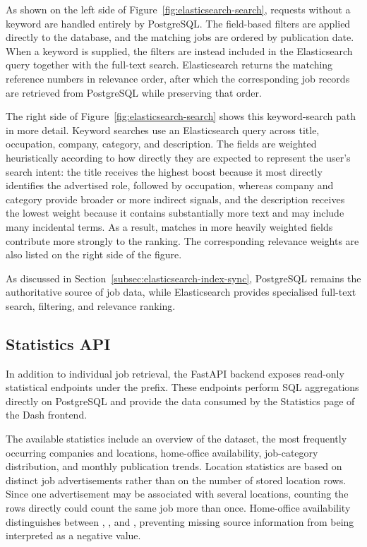 \documentclass[11pt,a4paper]{article}
\begin{document}
As shown on the left side of Figure~\ref{fig:elasticsearch-search}, requests without a keyword are handled entirely by PostgreSQL. The field-based filters are applied directly to the database, and the matching jobs are ordered by publication date. When a keyword is supplied, the filters are instead included in the Elasticsearch query together with the full-text search. Elasticsearch returns the matching reference numbers in relevance order, after which the corresponding job records are retrieved from PostgreSQL while preserving that order.

The right side of Figure~\ref{fig:elasticsearch-search} shows this keyword-search path in more detail. Keyword searches use an Elasticsearch  query across title, occupation, company, category, and description. The fields are weighted heuristically according to how directly they are expected to represent the user's search intent: the title receives the highest boost because it most directly identifies the advertised role, followed by occupation, whereas company and category provide broader or more indirect signals, and the description receives the lowest weight because it contains substantially more text and may include many incidental terms. As a result, matches in more heavily weighted fields contribute more strongly to the ranking. The corresponding relevance weights are also listed on the right side of the figure.

As discussed in Section~\ref{subsec:elasticsearch-index-sync}, PostgreSQL remains the authoritative source of job data, while Elasticsearch provides specialised full-text search, filtering, and relevance ranking.


\subsection{Statistics API}

In addition to individual job retrieval, the FastAPI backend exposes read-only statistical endpoints under the  prefix. These endpoints perform SQL aggregations directly on PostgreSQL and provide the data consumed by the Statistics page of the Dash frontend.

The available statistics include an overview of the dataset, the most frequently occurring companies and locations, home-office availability, job-category distribution, and monthly publication trends. Location statistics are based on distinct job advertisements rather than on the number of stored location rows. Since one advertisement may be associated with several locations, counting the rows directly could count the same job more than once. Home-office availability distinguishes between , , and , preventing missing source information from being interpreted as a negative value.
\end{document}
